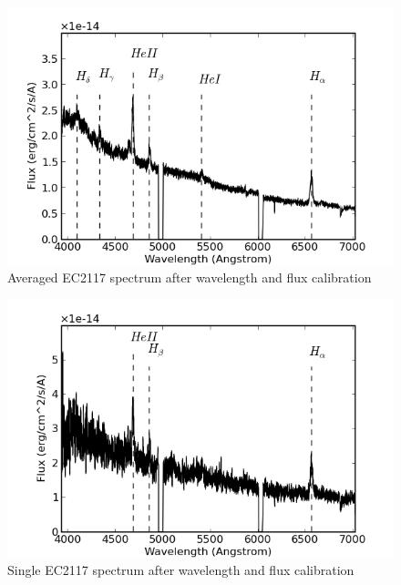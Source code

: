 \begin{figure}
\centering
\includegraphics[width=0.9\columnwidth, bb=0 0 600 400]{images/EC2117.png}
\caption[Averaged EC2117 spectrum]{Averaged EC2117 spectrum after wavelength and flux calibration}
\label{avEC2117spec}
\end{figure}

\begin{figure}
\centering
\includegraphics[width=0.9\columnwidth, bb=0 0 600 400]{images/EC0010.png}
\caption[Averaged EC2117 spectrum]{Single EC2117 spectrum after wavelength and flux calibration}
\label{singleEC2117spec}
\end{figure}



